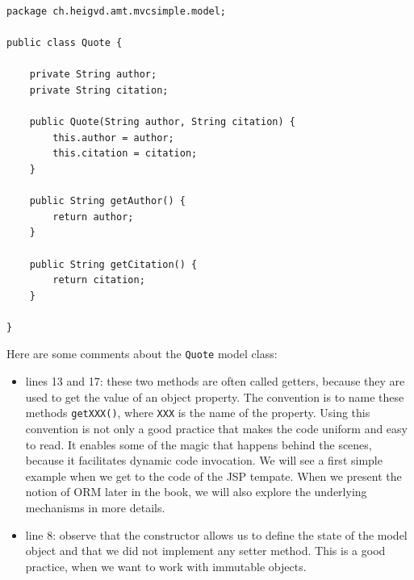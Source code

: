 \vspace{10pt}
\begin{minipage}{\linewidth}
\begin{lstlisting}[frame=single]
package ch.heigvd.amt.mvcsimple.model;

public class Quote {

    private String author;
    private String citation;

    public Quote(String author, String citation) {
        this.author = author;
        this.citation = citation;
    }

    public String getAuthor() {
        return author;
    }

    public String getCitation() {
        return citation;
    }

}
\end{lstlisting}
\end{minipage}

Here are some comments about the \texttt{Quote} model class:

\begin{itemize}
\item lines 13 and 17: these two methods are often called getters, because they are used to get the value of an object property. The convention is to name these methods \texttt{getXXX()}, where \texttt{XXX} is the name of the property. Using this convention is not only a good practice that makes the code uniform and easy to read. It enables some of the magic that happens behind the scenes, because it facilitates dynamic code invocation. We will see a first simple example when we get to the code of the \ac{JSP} tempate. When we present the notion of \ac{ORM} later in the book, we will also explore the underlying mechanisms in more details. 
\item line 8: observe that the constructor allows us to define the state of the model object and that we did not implement any setter method. This is a good practice, when we want to work with immutable objects.
\end{itemize}

